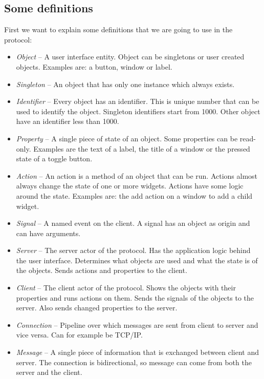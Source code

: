 \documentclass[11pt,a4paper]{article}
\begin{document}
\subsection{Some definitions}

First we want to explain some definitions that we are going to use in the protocol:

\begin{itemize}
\item \textit{Object} -- A user interface entity. Object can be singletons or user created objects. Examples are: a button, window or label.
\item \textit{Singleton} -- An object that has only one instance which always exists.
\item \textit{Identifier} -- Every object has an identifier.
This is unique number that can be used to identify the object.
Singleton identifiers start from 1000.
Other object have an identifier less than 1000.
\item \textit{Property} -- A single piece of state of an object. Some properties can be read-only.
Examples are the text of a label, the title of a window or the pressed state of a toggle button.
\item \textit{Action} -- An action is a method of an object that can be run.
Actions almost always change the state of one or more widgets.
Actions have some logic around the state.
Examples are: the add action on a window to add a child widget.
\item \textit{Signal} -- A named event on the client.
A signal has an object as origin and can have arguments.
\item \textit{Server} -- The server actor of the protocol.
Has the application logic behind the user interface.
Determines what objects are used and what the state is of the objects.
Sends actions and properties to the client.
\item \textit{Client} -- The client actor of the protocol.
Shows the objects with their properties and runs actions on them.
Sends the signals of the objects to the server.
Also sends changed properties to the server.
\item \textit{Connection} -- Pipeline over which messages are sent from client to server and vice versa.
Can for example be TCP/IP.
\item \textit{Message} -- A single piece of information that is exchanged between client and server.
The connection is bidirectional, so message can come from both the server and the client.
\end{itemize}
\end{document}
